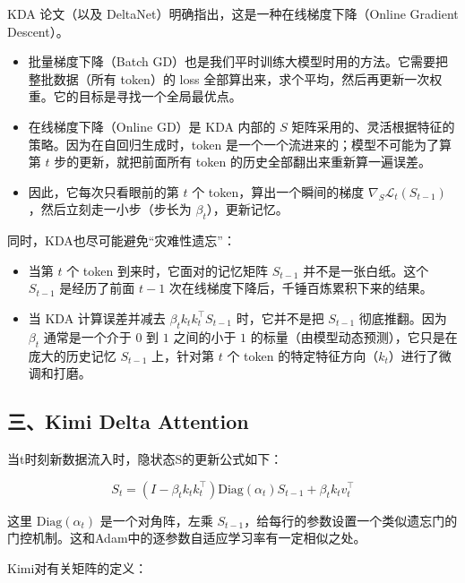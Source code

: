 KDA 论文（以及 DeltaNet）明确指出，这是一种在线梯度下降（Online Gradient Descent）。

\begin{itemize}
\tightlist
\item
  批量梯度下降（Batch GD）也是我们平时训练大模型时用的方法。它需要把整批数据（所有 token）的 loss 全部算出来，求个平均，然后再更新一次权重。它的目标是寻找一个全局最优点。
\item
  在线梯度下降（Online GD）是 KDA 内部的 \(S\) 矩阵采用的、灵活根据特征的策略。因为在自回归生成时，token 是一个一个流进来的；模型不可能为了算第 \(t\) 步的更新，就把前面所有 token 的历史全部翻出来重新算一遍误差。
\item
  因此，它每次只看眼前的第 \(t\) 个 token，算出一个瞬间的梯度 \(\nabla_S\mathcal{L}_t(S_{t-1})\)，然后立刻走一小步（步长为 \(\beta_t\)），更新记忆。
\end{itemize}

同时，KDA也尽可能避免``灾难性遗忘''：

\begin{itemize}
\tightlist
\item
  当第 \(t\) 个 token 到来时，它面对的记忆矩阵 \(S_{t-1}\) 并不是一张白纸。这个 \(S_{t-1}\) 是经历了前面 \(t-1\) 次在线梯度下降后，千锤百炼累积下来的结果。
\item
  当 KDA 计算误差并减去 \(\beta_t k_t k_t^\top S_{t-1}\) 时，它并不是把 \(S_{t-1}\) 彻底推翻。因为 \(\beta_t\) 通常是一个介于 \(0\) 到 \(1\) 之间的小于 \(1\) 的标量（由模型动态预测），它只是在庞大的历史记忆 \(S_{t-1}\) 上，针对第 \(t\) 个 token 的特定特征方向（\(k_t\)）进行了微调和打磨。
\end{itemize}

\hypertarget{ux4e09kimi-delta-attention}{%
\subsection{三、Kimi Delta Attention}\label{ux4e09kimi-delta-attention}}

当t时刻新数据流入时，隐状态S的更新公式如下：

\[
S_t=\left(I-\beta_t k_t k_t^\top\right)\mathrm{Diag}(\alpha_t)S_{t-1}+\beta_t k_t v_t^\top
\]

这里 \(\mathrm{Diag}(\alpha_t)\) 是一个对角阵，左乘 \(S_{t-1}\)，给每行的参数设置一个类似遗忘门的门控机制。这和Adam中的逐参数自适应学习率有一定相似之处。

Kimi对有关矩阵的定义：


